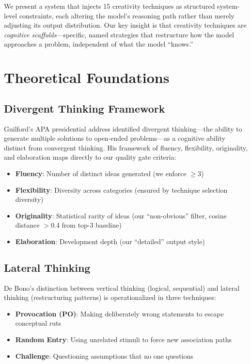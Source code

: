 \documentclass[11pt,a4paper]{article}
\begin{document}
We present a system that injects 15 creativity techniques as structured system-level constraints, each altering the model's reasoning path rather than merely adjusting its output distribution. Our key insight is that creativity techniques are \textit{cognitive scaffolds}---specific, named strategies that restructure how the model approaches a problem, independent of what the model ``knows.''

\section{Theoretical Foundations}

\subsection{Divergent Thinking Framework}

Guilford's \cite{guilford1950creativity} APA presidential address identified divergent thinking---the ability to generate multiple solutions to open-ended problems---as a cognitive ability distinct from convergent thinking. His framework of fluency, flexibility, originality, and elaboration maps directly to our quality gate criteria:

\begin{itemize}
    \item \textbf{Fluency}: Number of distinct ideas generated (we enforce $\geq$3)
    \item \textbf{Flexibility}: Diversity across categories (ensured by technique selection diversity)
    \item \textbf{Originality}: Statistical rarity of ideas (our ``non-obvious'' filter, cosine distance $>$0.4 from top-3 baseline)
    \item \textbf{Elaboration}: Development depth (our ``detailed'' output style)
\end{itemize}

\subsection{Lateral Thinking}

De Bono's \cite{debono1967lateral} distinction between vertical thinking (logical, sequential) and lateral thinking (restructuring patterns) is operationalized in three techniques:

\begin{itemize}
    \item \textbf{Provocation (PO)}: Making deliberately wrong statements to escape conceptual ruts
    \item \textbf{Random Entry}: Using unrelated stimuli to force new association paths
    \item \textbf{Challenge}: Questioning assumptions that no one questions
\end{itemize}
\end{document}
